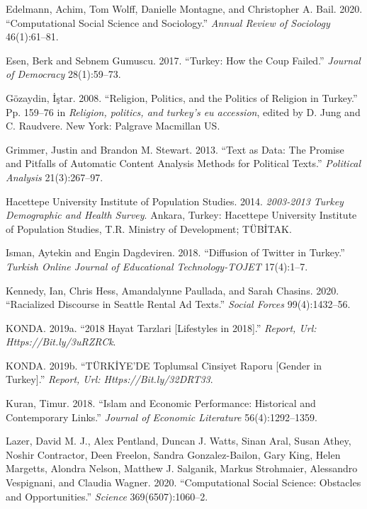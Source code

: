 \documentclass[
  12pt,
]{article}
\begin{document}
\leavevmode\hypertarget{ref-compsocsciARS20}{}%
Edelmann, Achim, Tom Wolff, Danielle Montagne, and Christopher A. Bail. 2020. ``Computational Social Science and Sociology.'' \emph{Annual Review of Sociology} 46(1):61--81.

\leavevmode\hypertarget{ref-esen2017turkey}{}%
Esen, Berk and Sebnem Gumuscu. 2017. ``Turkey: How the Coup Failed.'' \emph{Journal of Democracy} 28(1):59--73.

\leavevmode\hypertarget{ref-Guxf6zaydin2008}{}%
Gözaydin, İştar. 2008. ``Religion, Politics, and the Politics of Religion in Turkey.'' Pp. 159--76 in \emph{Religion, politics, and turkey's eu accession}, edited by D. Jung and C. Raudvere. New York: Palgrave Macmillan US.

\leavevmode\hypertarget{ref-grimmer2013text}{}%
Grimmer, Justin and Brandon M. Stewart. 2013. ``Text as Data: The Promise and Pitfalls of Automatic Content Analysis Methods for Political Texts.'' \emph{Political Analysis} 21(3):267--97.

\leavevmode\hypertarget{ref-Hac14}{}%
Hacettepe University Institute of Population Studies. 2014. \emph{2003-2013 Turkey Demographic and Health Survey}. Ankara, Turkey: Hacettepe University Institute of Population Studies, T.R. Ministry of Development; TÜBİTAK.

\leavevmode\hypertarget{ref-isman2018diffusion}{}%
Isman, Aytekin and Engin Dagdeviren. 2018. ``Diffusion of Twitter in Turkey.'' \emph{Turkish Online Journal of Educational Technology-TOJET} 17(4):1--7.

\leavevmode\hypertarget{ref-Racialized}{}%
Kennedy, Ian, Chris Hess, Amandalynne Paullada, and Sarah Chasins. 2020. ``Racialized Discourse in Seattle Rental Ad Texts.'' \emph{Social Forces} 99(4):1432--56.

\leavevmode\hypertarget{ref-Kon19}{}%
KONDA. 2019a. ``2018 Hayat Tarzlari {[}Lifestyles in 2018{]}.'' \emph{Report, Url: Https://Bit.ly/3uRZRCk}.

\leavevmode\hypertarget{ref-Kon19rap}{}%
KONDA. 2019b. ``TÜRKİYE'DE Toplumsal Cinsiyet Raporu {[}Gender in Turkey{]}.'' \emph{Report, Url: Https://Bit.ly/32DRT33}.

\leavevmode\hypertarget{ref-kuran2018islam}{}%
Kuran, Timur. 2018. ``Islam and Economic Performance: Historical and Contemporary Links.'' \emph{Journal of Economic Literature} 56(4):1292--1359.

\leavevmode\hypertarget{ref-Lazer1060}{}%
Lazer, David M. J., Alex Pentland, Duncan J. Watts, Sinan Aral, Susan Athey, Noshir Contractor, Deen Freelon, Sandra Gonzalez-Bailon, Gary King, Helen Margetts, Alondra Nelson, Matthew J. Salganik, Markus Strohmaier, Alessandro Vespignani, and Claudia Wagner. 2020. ``Computational Social Science: Obstacles and Opportunities.'' \emph{Science} 369(6507):1060--2.
\end{document}
